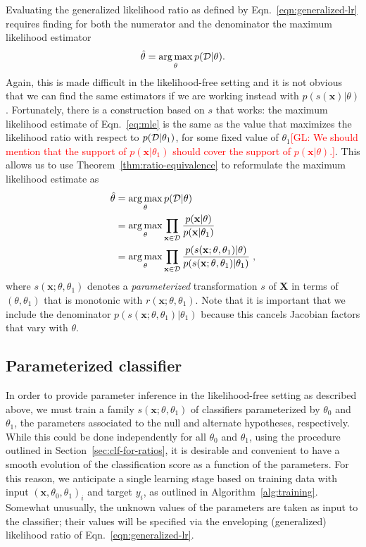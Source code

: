 \documentclass[12pt]{article}
\DeclareMathOperator*{\argmax}{arg\,max}
\numberwithin{equation}{section}
\theoremstyle{plain}
\newcommand{\glnote}[1]{\textcolor{red}{[GL: #1]}}
\begin{document}
Evaluating the generalized likelihood ratio as defined by
Eqn.~\ref{eqn:generalized-lr} requires finding for both the numerator and the
denominator the maximum likelihood estimator
\begin{equation}\label{eq:mle}
    \hat{\theta} = \argmax_\theta p({\cal D} | \theta).
\end{equation}
Again, this is made difficult in the likelihood-free setting and it is not
obvious that we can find the same estimators if we are working instead with
$p(s(\mathbf{x})|\theta)$. Fortunately, there is a construction
based on $s$ that works: the maximum likelihood estimate of Eqn.~\ref{eq:mle} is
the same as the value that maximizes the likelihood ratio with respect to
$p({\cal D}|\theta_1)$, for some fixed value of $\theta_1$\glnote{We should mention that the support of $p(\mathbf{x}|\theta_1)$ should cover the support of $p(\mathbf{x}|\theta)$.}.
This allows us to
use Theorem~\ref{thm:ratio-equivalence} to reformulate the maximum likelihood
estimate as
\begin{align}\label{eq:mle_withs}
\hat{\theta} &= \argmax_\theta  p({\cal D} | \theta) \nonumber \\
&= \argmax_\theta  \prod_{\mathbf{x} \in {\cal D}} \frac{p(\mathbf{x}| \theta)}{p(\mathbf{x}|\theta_1)} \nonumber \\
&= \argmax_\theta  \prod_{\mathbf{x} \in {\cal D}} \frac{p(s(\mathbf{x}; \theta, \theta_1) | \theta)}{p(s(\mathbf{x}; \theta, \theta_1) |\theta_1)} \;,
\end{align}
where $s(\mathbf{x};\theta,\theta_1)$ denotes a \textit{parameterized}
transformation $s$ of $\mathbf{X}$ in terms of $(\theta,\theta_1)$ that is monotonic
with $r(\mathbf{x};\theta,\theta_1)$. Note that it is important that we include
the denominator $p(s(\mathbf{x}; \theta, \theta_1) |\theta_1)$ because this
cancels Jacobian factors that vary with $\theta$.

\subsection{Parameterized classifier}

In order to provide parameter inference in the likelihood-free setting as
described above, we must train a family $s(\mathbf{x};\theta,\theta_1)$ of classifiers parameterized by
$\theta_0$ and $\theta_1$, the parameters associated to the null and alternate
hypotheses, respectively. While this could be done independently for all
$\theta_0$ and $\theta_1$, using the procedure outlined in
Section~\ref{sec:clf-for-ratios}, it is desirable and convenient to have a
smooth evolution of the classification score as a function of the parameters.
For this reason, we anticipate a single learning stage based on training data with input
$(\mathbf{x}, \theta_0, \theta_1)_i$ and target $y_i$, as outlined in Algorithm~\ref{alg:training}. Somewhat unusually, the
unknown values of the parameters are taken as input to the classifier; their
values will be specified via the enveloping (generalized) likelihood ratio of
Eqn.~\ref{eqn:generalized-lr}.
\end{document}
